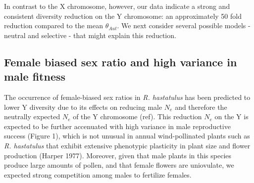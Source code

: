 \documentclass[9pt,twocolumn,twoside]{gsajnl}
\begin{document}

In contrast to the X chromosome, however, our data indicate a strong and consistent diversity reduction on the Y chromosome: an approximately 50 fold reduction compared to the mean $\theta_{Aut}$. We next consider several possible models - neutral and selective - that might explain this reduction.

\subsection*{Female biased sex ratio and high variance in male fitness}

The occurrence of female-biased sex ratios in \textit{R. hastatulus} has been predicted to lower Y diversity due to its effects on reducing male $N_{e}$ and therefore the neutrally expected $N_{e}$ of the Y chromosome (\X ref). This reduction $N_{e}$ on the Y is expected to be further accenuated with high variance in male reproductive success (Figure 1), which is not unusual in annual wind-pollinated plants such as \textit{R. hastatulus} that exhibit extensive phenotypic plasticity in plant size and flower production (\X Harper 1977). Moreover, given that male plants in this species produce large amounts of pollen, and that female flowers are uniovulate, we expected strong competition among males to fertilize females.
\end{document}
